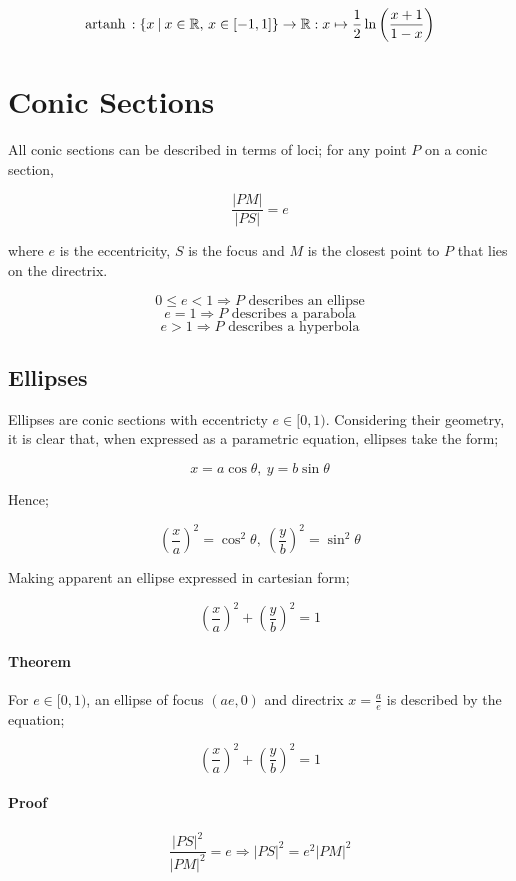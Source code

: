 \documentclass{article}
\newcommand{\st}{\:|\:}
\newcommand{\artanh}{\textrm{artanh\,}}
\begin{document}
\[\artanh : \left\{x \st x \in \mathbb{R},\, x \in \left[-1, 1\right]\right\}
\rightarrow \mathbb{R} : x \mapsto \frac{1}{2}\ln\left(\frac{x + 1}{1 -
x}\right)\]

\section{Conic Sections}

All conic sections can be described in terms of loci; for any point $P$ on a
conic section,

\[\frac{|PM|}{|PS|} = e\]

\noindent where $e$ is the eccentricity, $S$ is the focus and $M$ is the closest point to
$P$ that lies on the directrix.

\[0 \leq e < 1 \Rightarrow P \textrm{ describes an ellipse}\]
\[e = 1 \Rightarrow P \textrm{ describes a parabola}\]
\[e > 1 \Rightarrow P \textrm{ describes a hyperbola}\]

\subsection{Ellipses}

Ellipses are conic sections with eccentricty $e \in [0,1)$. Considering their
geometry, it is clear that, when expressed as a parametric equation, ellipses
take the form;

\[x = a\cos\theta,\: y = b\sin\theta\]

\noindent Hence;

\[\left(\frac{x}{a}\right)^2 = \cos^2\theta,\: \left(\frac{y}{b}\right)^2 =
\sin^2\theta\]

\noindent Making apparent an ellipse expressed in cartesian form;

\[\left(\frac{x}{a}\right)^2 + \left(\frac{y}{b}\right)^2 = 1\]

\paragraph{Theorem} For $e \in [0,1)$, an ellipse of focus $(ae, 0)$ and
directrix $x = \frac{a}{e}$ is described by the equation;

\[\left(\frac{x}{a}\right)^2 + \left(\frac{y}{b}\right)^2 = 1\]

\paragraph{Proof} 

\[\frac{|PS|^2}{|PM|^2} = e \Rightarrow |PS|^2 = e^2|PM|^2\]
\end{document}
